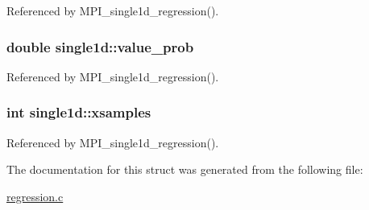 Referenced by M\+P\+I\+\_\+single1d\+\_\+regression().

\subsubsection[{\texorpdfstring{value\+\_\+prob}{value_prob}}]{\setlength{\rightskip}{0pt plus 5cm}double single1d\+::value\+\_\+prob}\hypertarget{structsingle1d_a5adc705aed86890610f261af8111b2ec}{}\label{structsingle1d_a5adc705aed86890610f261af8111b2ec}


Referenced by M\+P\+I\+\_\+single1d\+\_\+regression().

\subsubsection[{\texorpdfstring{xsamples}{xsamples}}]{\setlength{\rightskip}{0pt plus 5cm}int single1d\+::xsamples}\hypertarget{structsingle1d_aa0bcbb099a7182df190a633e5d35e39e}{}\label{structsingle1d_aa0bcbb099a7182df190a633e5d35e39e}


Referenced by M\+P\+I\+\_\+single1d\+\_\+regression().



The documentation for this struct was generated from the following file\+:\begin{DoxyCompactItemize}
\item 
\hyperlink{regression_8c}{regression.\+c}\end{DoxyCompactItemize}
